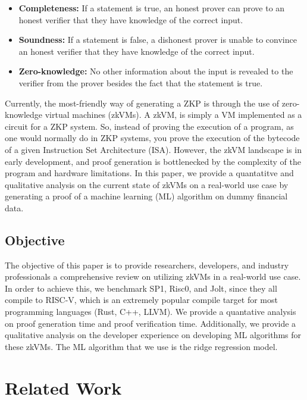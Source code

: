 \documentclass{scrartcl}
\begin{document}
\begin{itemize}
    \item \textbf{Completeness:} If a statement is true, an honest prover can prove to an honest verifier that they have knowledge of the correct input.
    \item \textbf{Soundness:} If a statement is false, a dishonest prover is unable to convince an honest verifier that they have knowledge of the correct input.
    \item \textbf{Zero-knowledge:} No other information about the input is revealed to the verifier from the prover besides the fact that the statement is true.
\end{itemize}

Currently, the most-friendly way of generating a ZKP is through the use of zero-knowledge virtual machines (zkVMs). A zkVM, is simply a VM implemented as a circuit for a ZKP system. So, instead of proving the execution of a program, as one would normally do in ZKP systems, you prove the execution of the bytecode of a given Instruction Set Architecture (ISA). However, the zkVM landscape is in early development, and proof generation is bottlenecked by the complexity of the program and hardware limitations. In this paper, we provide a quantatitve and qualitative analysis on the current state of zkVMs on a real-world use case by generating a proof of a machine learning (ML) algorithm on dummy financial data.

\subsection{Objective}

The objective of this paper is to provide researchers, developers, and industry professionals a comprehensive review on utilizing zkVMs in a real-world use case. In order to achieve this, we benchmark SP1\cite{Roy2024}, Risc0\cite{bruestle2023risc}, and Jolt\cite{arun2024jolt}, since they all compile to RISC-V, which is an extremely popular compile target for most programming languages (Rust, C++, LLVM). We provide a quantative analysis on proof generation time and proof verification time. Additionally, we provide a qualitative analysis on the developer experience on developing ML algorithms for these zkVMs. The ML algorithm that we use is the ridge regression model. 

\section{Related Work}
\end{document}
